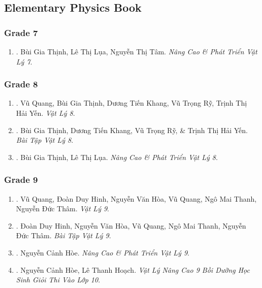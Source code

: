 \documentclass{article}
\begin{document}
\subsection{Elementary Physics Book}

\subsubsection{Grade 7}

\begin{enumerate}
	\item \cite{Thinh_Lua_ncpt_Vat_Ly_7}. Bùi Gia Thịnh, Lê Thị Lụa, Nguyễn Thị Tâm. {\it Nâng Cao \& Phát Triển Vật Lý 7}.\hfill{\sf[reading]}
\end{enumerate}

\subsubsection{Grade 8}

\begin{enumerate}
	\item \cite{SGK_Vat_Ly_8}. Vũ Quang, Bùi Gia Thịnh, Dương Tiến Khang, Vũ Trọng Rỹ, Trịnh Thị Hải Yến. {\it Vật Lý 8}.\hfill{\sf[reading]}
	\item \cite{SBT_Vat_Ly_8}. Bùi Gia Thịnh, Dương Tiến Khang, Vũ Trọng Rỹ, \& Trịnh Thị Hải Yến. {\it Bài Tập Vật Lý 8}.\hfill{\sf[reading]}
	\item \cite{Thinh_Lua_ncpt_Vat_Ly_8}. Bùi Gia Thịnh, Lê Thị Lụa. {\it Nâng Cao \& Phát Triển Vật Lý 8}.\hfill{\sf[reading]}
\end{enumerate}

\subsubsection{Grade 9}

\begin{enumerate}
	\item \cite{SGK_Vat_Ly_9}. Vũ Quang, Đoàn Duy Hinh, Nguyễn Văn Hòa, Vũ Quang, Ngô Mai Thanh, Nguyễn Đức Thâm. {\it Vật Lý 9}.\hfill{\sf[reading]}
	\item \cite{SBT_Vat_Ly_9}. Đoàn Duy Hinh, Nguyễn Văn Hòa, Vũ Quang, Ngô Mai Thanh, Nguyễn Đức Thâm. {\it Bài Tập Vật Lý 9}.\hfill{\sf[reading]}
	\item \cite{Hoe_Vat_Ly_9}. Nguyễn Cảnh Hòe. {\it Nâng Cao \& Phát Triển Vật Lý 9}.\hfill{\sf[reading]}
	\item \cite{Hoe_Hoach_Vat_Ly_nang_cao_9}. Nguyễn Cảnh Hòe, Lê Thanh Hoạch. {\it Vật Lý Nâng Cao 9 Bồi Dưỡng Học Sinh Giỏi Thi Vào Lớp 10}.\hfill{\sf[reading]}
\end{enumerate}
\end{document}
